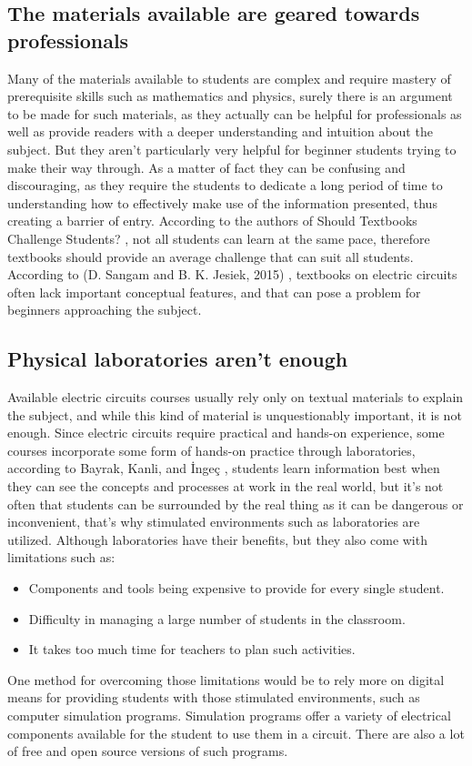 \documentclass[../main.tex]{subfiles}
\begin{document}
\subsection{The materials available are geared towards professionals}
Many of the materials available to students are complex and require mastery of prerequisite skills such as mathematics and physics, surely there is an argument to be made for such materials, as they actually can be helpful for professionals as well as provide readers with a deeper understanding and intuition about the subject. But they aren’t particularly very helpful for beginner students trying to make their way through. As a matter of fact they can be confusing and discouraging, as they require the students to dedicate a long period of time to understanding how to effectively make use of the information presented, thus creating a barrier of entry. According to the authors of Should Textbooks Challenge Students? \cite{19}, not all students can learn at the same pace, therefore textbooks should provide an average challenge that can suit all students. 
According to (D. Sangam and B. K. Jesiek, 2015) \cite{20}, textbooks on electric circuits often lack important conceptual features, and that can pose a problem for beginners approaching the subject.

\subsection{Physical laboratories aren’t enough}
Available electric circuits courses usually rely only on textual materials to explain the subject, and while this kind of material is unquestionably important, it is not enough. Since electric circuits require practical and hands-on experience, some courses incorporate some form of hands-on practice through laboratories, according to Bayrak, Kanli, and İngeç \cite{21}, students learn information best when they can see the concepts and processes at work in the real world, but it’s not often that students can be surrounded by the real thing as it can be dangerous or inconvenient, that’s why stimulated environments such as laboratories are utilized. Although laboratories have their benefits, but they also come with limitations such as:
\begin{itemize}
    \item Components and tools being expensive to provide for every single student.
    \item Difficulty in managing a large number of students in the classroom.
    \item It takes too much time for teachers to plan such activities.
\end{itemize}
One method for overcoming those limitations would be to rely more on digital means for providing students with those stimulated environments, such as computer simulation programs. Simulation programs offer a variety of electrical components available for the student to use them in a circuit. There are also a lot of free and open source versions of such programs.
\end{document}
